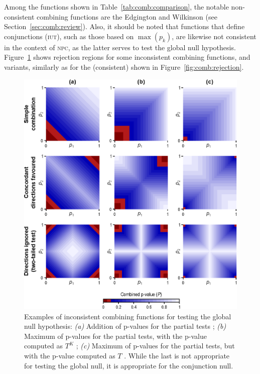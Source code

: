 Among the functions shown in Table~\ref{tab:comb:comparison}, the notable non-consistent combining functions are the Edgington and Wilkinson (see Section~\ref{sec:comb:review}). Also, it should be noted that functions that define conjunctions (\textsc{iut}), such as those based on $\max\left(p_k\right)$, are likewise not consistent in the context of \textsc{npc}, as the latter serves to test the global null hypothesis. Figure~\ref{fig:comb:inconsistent} shows rejection regions for some inconsistent combining functions, and variants, similarly as for the (consistent) shown in Figure~\ref{fig:comb:rejection}.

\begin{figure}[p]
\begin{center}
\centerline{\includegraphics[scale=.8]{images/inconsistent.eps}}
\end{center}
\caption[Examples of inconsistent combining functions.]{Examples of inconsistent combining functions for testing the global null hypothesis: \emph{(a)} Addition of p-values for the partial tests \citep{Edgington1972}; \emph{(b)} Maximum of p-values for the partial tests, with the p-value computed as $T^K$ \citep{Friston1999, Friston2005}; \emph{(c)} Maximum of p-values for the partial tests, but with the p-value computed as $T$ \citep{Nichols2005}. While the last is not appropriate for testing the global null, it is appropriate for the conjunction null.}
\label{fig:comb:inconsistent}
\end{figure}


